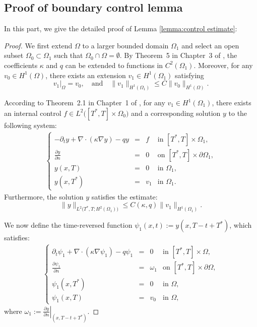 \documentclass[12pt]{amsart}
\begin{document}
\subsection{Proof of boundary control lemma}\label{appendix:proof of lemma4}
In this part, we give the detailed proof of Lemma \ref{lemma:control estimate}:
\begin{proof}
We first extend $\Omega$ to a larger bounded domain $\Omega_1$ and select an open subset $\Omega_0 \subset \Omega_1$ such that $\Omega_0 \cap \Omega = \emptyset$. By Theorem~5 in Chapter~3 of \cite{stein_singular_1970}, the coefficients $\kappa$ and $q$ can be extended to functions in $C^2(\Omega_1)$. Moreover, for any $v_0 \in H^1(\Omega)$, there exists an extension $v_1 \in H^1(\Omega_1)$ satisfying
\[
v_1|_{\Omega} = v_0, \quad \text{and} \quad \|v_1\|_{H^1(\Omega_1)} \leq C \|v_0\|_{H^1(\Omega)}.
\]

According to Theorem~2.1 in Chapter~1 of \cite{fursikov_controllability_1996}, for any $v_1 \in H^1(\Omega_1)$, there exists an internal control $f \in L^2\big([T^*, T] \times \Omega_0\big)$ and a corresponding solution $y$ to the following system:
\begin{align*}
\left\{
\begin{array}{rcll}
- \partial_t y + \nabla \cdot (\kappa \nabla y) - q y &=& f & \text{in } [T^*, T] \times \Omega_1, \\
\frac{\partial y}{\partial n} &=& 0 & \text{on } [T^*, T] \times \partial\Omega_1, \\
y(x, T) &=& 0 & \text{in } \Omega_1, \\
y(x, T^*) &=& v_1 & \text{in } \Omega_1.
\end{array}
\right.
\end{align*}
Furthermore, the solution $y$ satisfies the estimate:
\[
\|y\|_{L^2\big(T^*, T; H^2(\Omega_1)\big)} \leq C(\kappa, q) \|v_1\|_{H^1(\Omega_1)}.
\]

We now define the time-reversed function $\psi_1(x, t) := y(x, T - t + T^*)$, which satisfies:
\begin{align*}
\left\{
\begin{array}{rcll}
\partial_t \psi_1 + \nabla \cdot (\kappa \nabla \psi_1) - q \psi_1 &=& 0 & \text{in } [T^*, T] \times \Omega, \\
\frac{\partial \psi_1}{\partial n} &=& \omega_1 & \text{on } [T^*, T] \times \partial\Omega, \\
\psi_1(x, T^*) &=& 0 & \text{in } \Omega, \\
\psi_1(x, T) &=& v_0 & \text{in } \Omega,
\end{array}
\right.
\end{align*}
where $\omega_1 := \left. \frac{\partial y}{\partial n} \right|_{(x, T - t + T^*)}$.


\end{proof}
\end{document}
